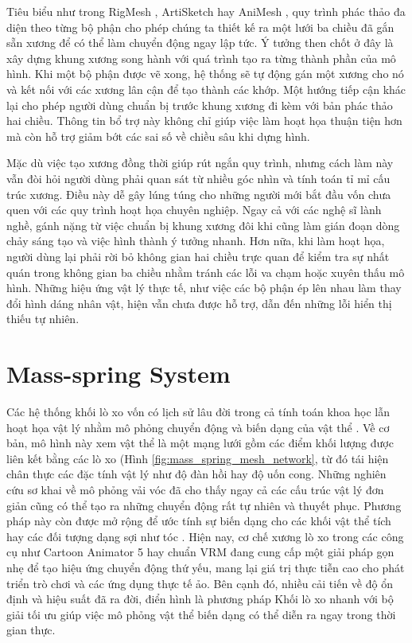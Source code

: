 \documentclass{report}
\begin{document}
Tiêu biểu như trong RigMesh \citep{Borosan2012}, ArtiSketch \citep{Levi2013} hay AniMesh \citep{Jin2015}, quy trình phác thảo đa diện theo từng bộ phận cho phép chúng ta thiết kế ra một lưới ba chiều đã gắn sẵn xương để có thể làm chuyển động ngay lập tức. Ý tưởng then chốt ở đây là xây dựng khung xương song hành với quá trình tạo ra từng thành phần của mô hình. Khi một bộ phận được vẽ xong, hệ thống sẽ tự động gán một xương cho nó và kết nối với các xương lân cận để tạo thành các khớp. Một hướng tiếp cận khác \citep{Bessmeltsev2015} lại cho phép người dùng chuẩn bị trước khung xương đi kèm với bản phác thảo hai chiều. Thông tin bổ trợ này không chỉ giúp việc làm hoạt họa thuận tiện hơn mà còn hỗ trợ giảm bớt các sai số về chiều sâu khi dựng hình.

Mặc dù việc tạo xương đồng thời giúp rút ngắn quy trình, nhưng cách làm này vẫn đòi hỏi người dùng phải quan sát từ nhiều góc nhìn và tính toán tỉ mỉ cấu trúc xương. Điều này dễ gây lúng túng cho những người mới bắt đầu vốn chưa quen với các quy trình hoạt họa chuyên nghiệp. Ngay cả với các nghệ sĩ lành nghề, gánh nặng từ việc chuẩn bị khung xương đôi khi cũng làm gián đoạn dòng chảy sáng tạo và việc hình thành ý tưởng nhanh. Hơn nữa, khi làm hoạt họa, người dùng lại phải rời bỏ không gian hai chiều trực quan để kiểm tra sự nhất quán trong không gian ba chiều nhằm tránh các lỗi va chạm hoặc xuyên thấu mô hình. Những hiệu ứng vật lý thực tế, như việc các bộ phận ép lên nhau làm thay đổi hình dáng nhân vật, hiện vẫn chưa được hỗ trợ, dẫn đến những lỗi hiển thị thiếu tự nhiên.

\section{Mass-spring System}
Các hệ thống khối lò xo vốn có lịch sử lâu đời trong cả tính toán khoa học lẫn hoạt họa vật lý nhằm mô phỏng chuyển động và biến dạng của vật thể \citep{pbaintro}. Về cơ bản, mô hình này xem vật thể là một mạng lưới gồm các điểm khối lượng được liên kết bằng các lò xo (Hình \ref{fig:mass_spring_mesh_network}, từ đó tái hiện chân thực các đặc tính vật lý như độ đàn hồi hay độ uốn cong. Những nghiên cứu sơ khai về mô phỏng vải vóc \citep{provot1995, bridson2022cloth} đã cho thấy ngay cả các cấu trúc vật lý đơn giản cũng có thể tạo ra những chuyển động rất tự nhiên và thuyết phục. Phương pháp này còn được mở rộng để ước tính sự biến dạng cho các khối vật thể tích \citep{teschner2004collision} hay các đối tượng dạng sợi như tóc \citep{MSHair08, MSHair91}. Hiện nay, cơ chế xương lò xo trong các công cụ như Cartoon Animator 5 \citep{cartoon_animator} hay chuẩn VRM \citep{vrm_springbone} đang cung cấp một giải pháp gọn nhẹ để tạo hiệu ứng chuyển động thứ yếu, mang lại giá trị thực tiễn cao cho phát triển trò chơi và các ứng dụng thực tế ảo. Bên cạnh đó, nhiều cải tiến về độ ổn định và hiệu suất đã ra đời, điển hình là phương pháp Khối lò xo nhanh \citep{fastmassspring} với bộ giải tối ưu giúp việc mô phỏng vật thể biến dạng có thể diễn ra ngay trong thời gian thực.
\end{document}
